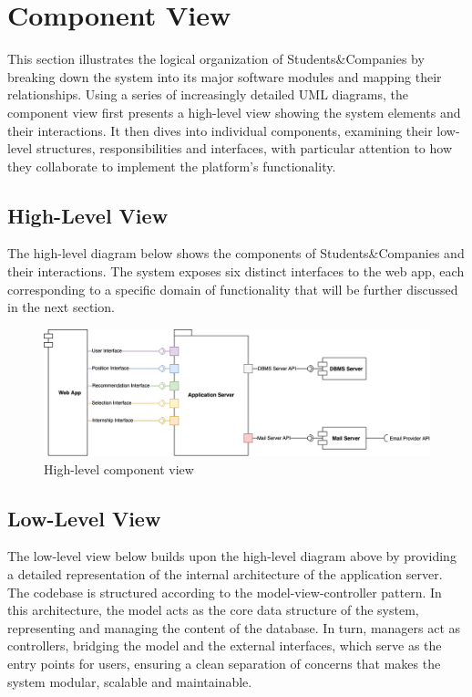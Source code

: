 \section{Component View}
This section illustrates the logical organization of Students\&Companies by breaking down the system into its major software modules and mapping their relationships.
Using a series of increasingly detailed UML diagrams, the component view first presents a high-level view showing the system elements and their interactions.
It then dives into individual components, examining their low-level structures, responsibilities and interfaces, with particular attention to how they collaborate to implement the platform's functionality.

\subsection{High-Level View}
The high-level diagram below shows the components of Students\&Companies and their interactions.
The system exposes six distinct interfaces to the web app, each corresponding to a specific domain of functionality that will be further discussed in the next section.

\begin{figure}[h]
    \centering
    \includegraphics[width=16cm]{images/component-view/high-level.png}
    \caption{High-level component view}
\end{figure}

\subsection{Low-Level View}
The low-level view below builds upon the high-level diagram above by providing a detailed representation of the internal architecture of the application server.
The codebase is structured according to the model-view-controller pattern.
In this architecture, the model acts as the core data structure of the system, representing and managing the content of the database.
In turn, managers act as controllers, bridging the model and the external interfaces, which serve as the entry points for users, ensuring a clean separation of concerns that makes the system modular, scalable and maintainable.

